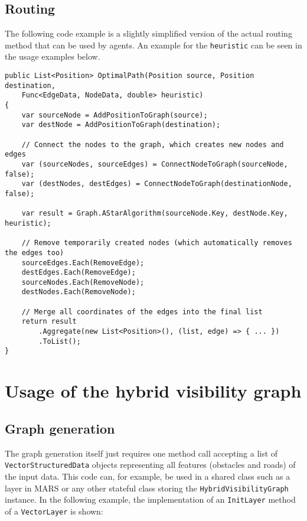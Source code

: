 	\subsection*{Routing}
	
		The following code example is a slightly simplified version of the actual routing method that can be used by agents.
		An example for the \texttt{heuristic} can be seen in the usage examples below.
		
		\begin{verbatim}
public List<Position> OptimalPath(Position source, Position destination,
	Func<EdgeData, NodeData, double> heuristic)
{
	var sourceNode = AddPositionToGraph(source);
	var destNode = AddPositionToGraph(destination);
	
	// Connect the nodes to the graph, which creates new nodes and edges
	var (sourceNodes, sourceEdges) = ConnectNodeToGraph(sourceNode, false);
	var (destNodes, destEdges) = ConnectNodeToGraph(destinationNode, false);
	
	var result = Graph.AStarAlgorithm(sourceNode.Key, destNode.Key, heuristic);
	
	// Remove temporarily created nodes (which automatically removes the edges too)
	sourceEdges.Each(RemoveEdge);
	destEdges.Each(RemoveEdge);
	sourceNodes.Each(RemoveNode);
	destNodes.Each(RemoveNode);
	
	// Merge all coordinates of the edges into the final list
	return result
		.Aggregate(new List<Position>(), (list, edge) => { ... })
		.ToList();
}
		\end{verbatim}

\section*{Usage of the hybrid visibility graph}
	
	\subsection*{Graph generation}
	
		The graph generation itself just requires one method call accepting a list of \texttt{VectorStructuredData} objects representing all features (obstacles and roads) of the input data.
		This code can, for example, be used in a shared class such as a layer in MARS or any other stateful class storing the \texttt{HybridVisibilityGraph} instance.
		In the following example, the implementation of an \texttt{InitLayer} method of a \texttt{VectorLayer} is shown:
	
